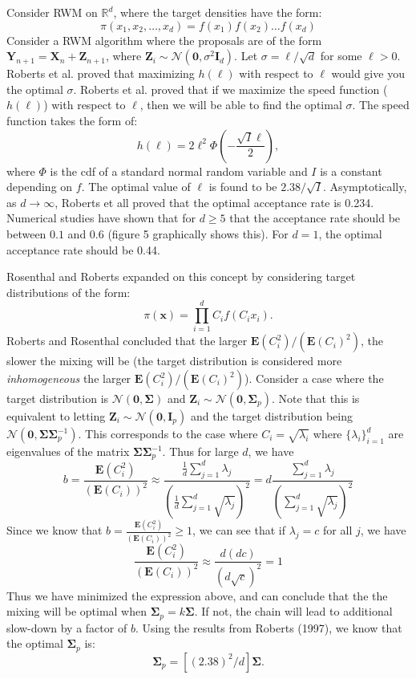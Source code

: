 \documentclass[twoside]{article}
\begin{document}
Consider RWM on $\mathbb{R}^d$, where the target densities have the form:
\begin{equation}
\pi(x_1, x_2, \dots, x_d) = f(x_1) f(x_2)\dots f(x_d)
\label{eq3}
\end{equation}
Consider a RWM algorithm where the proposals are of the form $\mathbf{Y}_{n+1} = \mathbf{X}_n + \mathbf{Z}_{n+1}$, where $\mathbf{Z}_i\sim \mathcal{N}(\mathbf{0}, \sigma^2 \mathbf{I}_d)$. Let $\sigma = \ell/\sqrt{d}$ for some $\ell > 0$. Roberts et al. proved that maximizing $h(\ell)$ with respect to $\ell$ would give you the optimal $\sigma$. Roberts et al. proved that if we maximize the speed function ($h(\ell)$) with respect to $\ell$, then we will be able to find the optimal $\sigma$. The speed function takes the form of:
$$h(\ell) = 2\ell^2\Phi\left(-\frac{\sqrt{I}\ell}{2}\right),$$ where $\Phi$ is the cdf of a standard normal random variable and $I$ is a constant depending on $f$. The optimal value of $\ell$ is found to be $2.38/ \sqrt{I}$. Asymptotically, as $d \rightarrow \infty$, Roberts et all proved that the optimal acceptance rate is 0.234. Numerical studies have shown that for $d \ge 5$ that the acceptance rate should be between $0.1$ and $0.6$ (figure 5 graphically shows this). For $d =1$, the optimal acceptance rate should be 0.44.

Rosenthal and Roberts expanded on this concept by considering target distributions of the form:
\begin{equation}
\pi(\mathbf{x}) = \prod_{i=1}^d C_if(C_ix_i).
\label{eq4}
\end{equation}
Roberts and Rosenthal concluded that the larger $\mathbf{E}(C_i^2)/ (\mathbf{E}(C_i)^2)$, the slower the mixing will be (the target distribution is considered more \textit{inhomogeneous} the larger $\mathbf{E}(C_i^2)/ (\mathbf{E}(C_i)^2)$). Consider a case where the target distribution is $\mathcal{N}(\mathbf{0}, \boldsymbol{\Sigma})$ and $\mathbf{Z}_i \sim \mathcal{N}(\mathbf{0}, \boldsymbol{\Sigma}_p)$. Note that this is equivalent to letting $\mathbf{Z}_i \sim \mathcal{N}(\mathbf{0}, \mathbf{I}_p)$ and the target distribution being $\mathcal{N}(\mathbf{0}, \boldsymbol{\Sigma}\boldsymbol{\Sigma}^{-1}_p)$. This corresponds to the case where $C_i = \sqrt{\lambda_i}$ where $\{\lambda_i\}_{i=1}^d$ are eigenvalues of the matrix $\boldsymbol{\Sigma}\boldsymbol{\Sigma}_p^{-1}$. Thus for large $d$, we have
$$b = \frac{\mathbf{E}(C_i^2)}{(\mathbf{E}(C_i))^2} \approx \frac{\frac{1}{d}\sum_{j=1}^d \lambda_j}{\left(\frac{1}{d}\sum_{j=1}^d \sqrt{\lambda_j} \right)^2} = d \frac{\sum_{j=1}^d \lambda_j}{\left(\sum_{j=1}^d \sqrt{\lambda_j} \right)^2}$$
Since we know that $b =\frac{\mathbf{E}(C_i^2)}{(\mathbf{E}(C_i))^2} \ge 1$, we can see that if $\lambda_j = c$ for all $j$, we have
$$\frac{\mathbf{E}(C_i^2)}{(\mathbf{E}(C_i))^2} \approx  \frac{d (dc)}{\left(d\sqrt{c} \right)^2} = 1$$ 
Thus we have minimized the expression above, and can conclude that the the mixing will be optimal when  $\boldsymbol{\Sigma}_p = k\boldsymbol{\Sigma}$. If not, the chain will lead to additional slow-down by a factor of $b$. Using the results from Roberts (1997), we know that the optimal $\boldsymbol{\Sigma}_p$ is:
$$\boldsymbol{\Sigma}_p = [(2.38)^2/d]\boldsymbol{\Sigma}.$$
\end{document}
